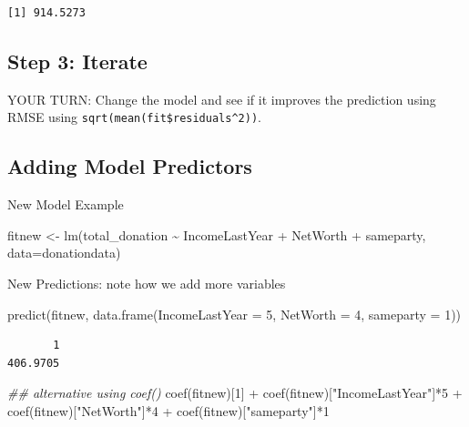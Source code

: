 \documentclass[
  letterpaper,
  DIV=11,
  numbers=noendperiod]{scrreprt}
\newenvironment{Shaded}{\begin{snugshade}}{\end{snugshade}}
\newcommand{\AttributeTok}[1]{\textcolor[rgb]{0.40,0.45,0.13}{#1}}
\newcommand{\DecValTok}[1]{\textcolor[rgb]{0.68,0.00,0.00}{#1}}
\newcommand{\DocumentationTok}[1]{\textcolor[rgb]{0.37,0.37,0.37}{\textit{#1}}}
\newcommand{\FunctionTok}[1]{\textcolor[rgb]{0.28,0.35,0.67}{#1}}
\newcommand{\NormalTok}[1]{\textcolor[rgb]{0.00,0.23,0.31}{#1}}
\newcommand{\OtherTok}[1]{\textcolor[rgb]{0.00,0.23,0.31}{#1}}
\newcommand{\SpecialCharTok}[1]{\textcolor[rgb]{0.37,0.37,0.37}{#1}}
\newcommand{\StringTok}[1]{\textcolor[rgb]{0.13,0.47,0.30}{#1}}
\begin{document}
\begin{verbatim}
[1] 914.5273
\end{verbatim}

\hypertarget{step-3-iterate}{%
\subsection{Step 3: Iterate}\label{step-3-iterate}}

YOUR TURN: Change the model and see if it improves the prediction using
RMSE using \texttt{sqrt(mean(fit\$residuals\^{}2))}.

\hypertarget{adding-model-predictors}{%
\subsection{Adding Model Predictors}\label{adding-model-predictors}}

New Model Example

\begin{Shaded}
\begin{Highlighting}[]
\NormalTok{fitnew }\OtherTok{\textless{}{-}} \FunctionTok{lm}\NormalTok{(total\_donation }\SpecialCharTok{\textasciitilde{}}\NormalTok{ IncomeLastYear }\SpecialCharTok{+}\NormalTok{ NetWorth }\SpecialCharTok{+}\NormalTok{ sameparty, }
             \AttributeTok{data=}\NormalTok{donationdata)}
\end{Highlighting}
\end{Shaded}

New Predictions: note how we add more variables

\begin{Shaded}
\begin{Highlighting}[]
\FunctionTok{predict}\NormalTok{(fitnew, }\FunctionTok{data.frame}\NormalTok{(}\AttributeTok{IncomeLastYear =} \DecValTok{5}\NormalTok{, }\AttributeTok{NetWorth =} \DecValTok{4}\NormalTok{, }\AttributeTok{sameparty =} \DecValTok{1}\NormalTok{))}
\end{Highlighting}
\end{Shaded}

\begin{verbatim}
       1 
406.9705 
\end{verbatim}

\begin{Shaded}
\begin{Highlighting}[]
\DocumentationTok{\#\# alternative using coef()}
\FunctionTok{coef}\NormalTok{(fitnew)[}\DecValTok{1}\NormalTok{] }\SpecialCharTok{+} \FunctionTok{coef}\NormalTok{(fitnew)[}\StringTok{"IncomeLastYear"}\NormalTok{]}\SpecialCharTok{*}\DecValTok{5} \SpecialCharTok{+} 
  \FunctionTok{coef}\NormalTok{(fitnew)[}\StringTok{"NetWorth"}\NormalTok{]}\SpecialCharTok{*}\DecValTok{4} \SpecialCharTok{+} \FunctionTok{coef}\NormalTok{(fitnew)[}\StringTok{"sameparty"}\NormalTok{]}\SpecialCharTok{*}\DecValTok{1}
\end{Highlighting}
\end{Shaded}
\end{document}
